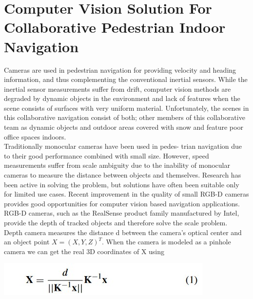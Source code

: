 \chapter{Computer Vision Solution For Collaborative
Pedestrian Indoor Navigation
}
 
\setcounter{equation}{0}
Cameras are used in pedestrian navigation for providing
velocity and heading information, and thus complementing
the conventional inertial sensors. While the inertial sensor
measurements suffer from drift, computer vision methods are
degraded by dynamic objects in the environment and lack of
features when the scene consists of surfaces with very uniform material. Unfortunately, the scenes in this collaborative
navigation consist of both; other members of this collaborative
team as dynamic objects and outdoor areas covered with snow
and feature poor office spaces indoors.\\
Traditionally monocular cameras have been used in pedes-
trian navigation due to their good performance combined
with small size. However, speed measurements suffer from
scale ambiguity due to the inability of monocular cameras
to measure the distance between objects and themselves.
Research has been active in solving the problem, but solutions
have often been suitable only for limited use cases. Recent
improvement in the quality of small RGB-D cameras provides good opportunities for computer vision based navigation
applications. RGB-D cameras, such as the RealSense product
family manufactured by Intel, provide the depth of tracked
objects and therefore solve the scale problem.\\
Depth camera measures the distance d between the camera’s
optical center and an object point \begin{math}X =(X, Y, Z )^T\end{math}.
When the camera is modeled as a pinhole camera we can get the real
3D coordinates of X using
\begin{center}
   \includegraphics{eq1.jpg}
   \end{center}
  
